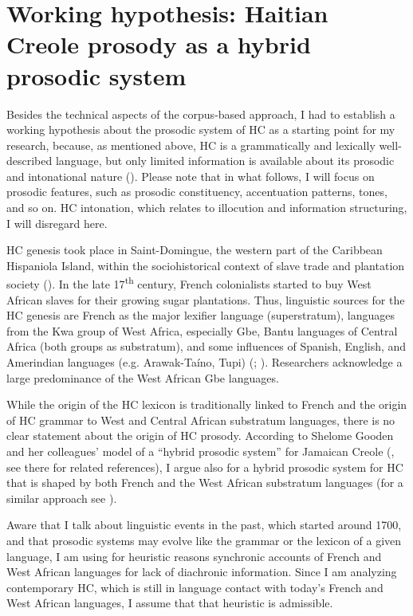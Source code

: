 \documentclass[output=paper]{langsci/langscibook}
\begin{document}
\section{\label{sec:kal:2} Working hypothesis: Haitian Creole prosody as a hybrid prosodic system}

Besides the technical aspects of the corpus-based approach, I had to establish a working hypothesis about the prosodic system of HC as a starting point for my research, because, as mentioned above, HC is a grammatically and lexically well-described language, but only limited information is available about its prosodic and intonational nature (\citealt{Cadely1997,Brousseau2003,Fattier2005}). Please note that in what follows, I will focus on prosodic features, such as prosodic constituency, accentuation patterns, tones, and so on. HC intonation, which relates to illocution and information structuring, I will disregard here.

HC genesis took place in Saint-Domingue, the western part of the Caribbean Hispaniola Island, within the sociohistorical context of slave trade and plantation society (\citealt{McWhorter2005,Eltis2010}). In the late 17\textsuperscript{th} century, French colonialists started to buy West African slaves for their growing sugar plantations. Thus, linguistic sources for the HC genesis are French as the major lexifier language (superstratum), languages from the Kwa group of West Africa, especially Gbe, Bantu languages of Central Africa (both groups as substratum), and some influences of Spanish, English, and Amerindian languages (e.g. Arawak-Taíno, Tupi) (\citealt[52-57]{Lefebvre2006}; \citealt[195]{Fattier2013}). Researchers acknowledge a large predominance of the West African Gbe languages.

While the origin of the HC lexicon is traditionally linked to French and the origin of HC grammar to West and Central African substratum languages, there is no clear statement about the origin of HC prosody. According to Shelome Gooden and her colleagues’ model of a “hybrid prosodic system” for Jamaican Creole (\citealt{Gooden2009}, see there for related references), I argue also for a hybrid prosodic system for HC that is shaped by both French and the West African substratum languages (for a similar approach see \citealt{Brousseau2003}).

Aware that I talk about linguistic events in the past, which started around 1700, and that prosodic systems may evolve like the grammar or the lexicon of a given language, I am using for heuristic reasons synchronic accounts of French and West African languages for lack of diachronic information. Since I am analyzing contemporary HC, which is still in language contact with today’s French and West African languages, I assume that that heuristic is admissible.
\end{document}
